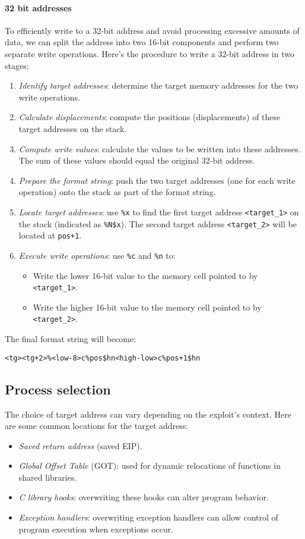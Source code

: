 \paragraph*{32 bit addresses}
To efficiently write to a 32-bit address and avoid processing excessive amounts of data, we can split the address into two 16-bit components and perform two separate write operations.
Here's the procedure to write a 32-bit address in two stages:
\begin{enumerate}
    \item \textit{Identify target addresses}: determine the target memory addresses for the two write operations.
    \item \textit{Calculate displacements}: compute the positions (displacements) of these target addresses on the stack.
    \item \textit{Compute write values}: calculate the values to be written into these addresses. 
        The sum of these values should equal the original 32-bit address.
    \item \textit{Prepare the format string}: push the two target addresses (one for each write operation) onto the stack as part of the format string.
    \item \textit{Locate target addresses}: use \texttt{\%x} to find the first target address \texttt{<target\_1>} on the stack (indicated as \texttt{\%N\$x}). 
        The second target address \texttt{<target\_2>} will be located at \texttt{pos+1}.
    \item \textit{Execute write operations}: use \texttt{\%c} and \texttt{\%n} to:
        \begin{itemize}
            \item Write the lower 16-bit value to the memory cell pointed to by \texttt{<target\_1>}.
            \item Write the higher 16-bit value to the memory cell pointed to by \texttt{<target\_2>}.
        \end{itemize}
\end{enumerate}
The final format string will become:
\begin{verbatim}
<tg><tg+2>%<low-8>c%pos$hn<high-low>c%pos+1$hn
\end{verbatim}

\subsection{Process selection}
The choice of target address can vary depending on the exploit's context. 
Here are some common locations for the target address:
\begin{itemize}
    \item \textit{Saved return address} (saved EIP). 
    \item \textit{Global Offset Table} (GOT): used for dynamic relocations of functions in shared libraries.
    \item \textit{C library hooks}: overwriting these hooks can alter program behavior.
    \item \textit{Exception handlers}: overwriting exception handlers can allow control of program execution when exceptions occur.
\end{itemize}

